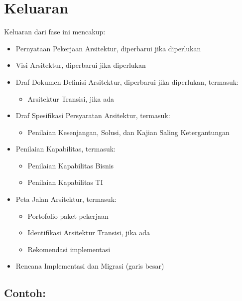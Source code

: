 \section{Keluaran}
Keluaran dari fase ini mencakup:
\begin{itemize}
	\item Pernyataan Pekerjaan Arsitektur, diperbarui jika diperlukan
	\item Visi Arsitektur, diperbarui jika diperlukan
	\item Draf Dokumen Definisi Arsitektur, diperbarui jika diperlukan, termasuk:
	\begin{itemize}
		\item Arsitektur Transisi, jika ada
	\end{itemize}
	\item Draf Spesifikasi Persyaratan Arsitektur, termasuk:
	\begin{itemize}
		\item Penilaian Kesenjangan, Solusi, dan Kajian Saling Ketergantungan
	\end{itemize}
	\item Penilaian Kapabilitas, termasuk:
	\begin{itemize}
		\item Penilaian Kapabilitas Bisnis
		\item Penilaian Kapabilitas TI
	\end{itemize}
	\item Peta Jalan Arsitektur, termasuk:
	\begin{itemize}
		\item Portofolio paket pekerjaan
		\item Identifikasi Arsitektur Transisi, jika ada
		\item Rekomendasi implementasi
	\end{itemize}
	\item Rencana Implementasi dan Migrasi (garis besar)
\end{itemize}

\subsection*{Contoh:}

